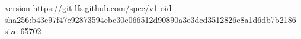 version https://git-lfs.github.com/spec/v1
oid sha256:b43e97f47e92873594ebc30c066512d90890a3e3dcd3512826c8a1d6db7b2186
size 65702
